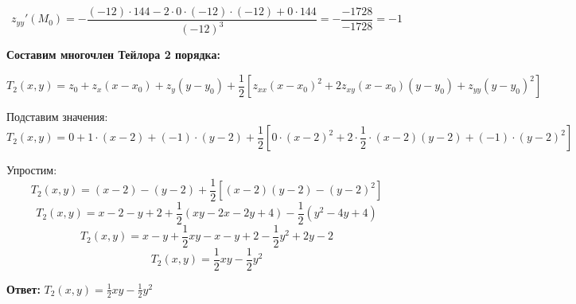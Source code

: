 \begin{solution}
\[ z_{yy}'(M_0) = -\frac{(-12) \cdot 144 - 2 \cdot 0 \cdot (-12) \cdot (-12) + 0 \cdot 144}{(-12)^3} = -\frac{-1728}{-1728} = -1 \]

\textbf{Составим многочлен Тейлора 2 порядка:}

\[ T_2(x,y) = z_0 + z_x(x-x_0) + z_y(y-y_0) + \frac{1}{2}\left[z_{xx}(x-x_0)^2 + 2z_{xy}(x-x_0)(y-y_0) + z_{yy}(y-y_0)^2\right] \]

Подставим значения:
\[ T_2(x,y) = 0 + 1 \cdot (x-2) + (-1) \cdot (y-2) + \frac{1}{2}\left[0 \cdot (x-2)^2 + 2 \cdot \frac{1}{2} \cdot (x-2)(y-2) + (-1) \cdot (y-2)^2\right] \]

Упростим:
\[ T_2(x,y) = (x-2) - (y-2) + \frac{1}{2}\left[(x-2)(y-2) - (y-2)^2\right] \]
\[ T_2(x,y) = x - 2 - y + 2 + \frac{1}{2}(xy - 2x - 2y + 4) - \frac{1}{2}(y^2 - 4y + 4) \]
\[ T_2(x,y) = x - y + \frac{1}{2}xy - x - y + 2 - \frac{1}{2}y^2 + 2y - 2 \]
\[ T_2(x,y) = \frac{1}{2}xy - \frac{1}{2}y^2 \]

\textbf{Ответ:} \( \displaystyle T_2(x,y) = \frac{1}{2}xy - \frac{1}{2}y^2 \)
\end{solution}